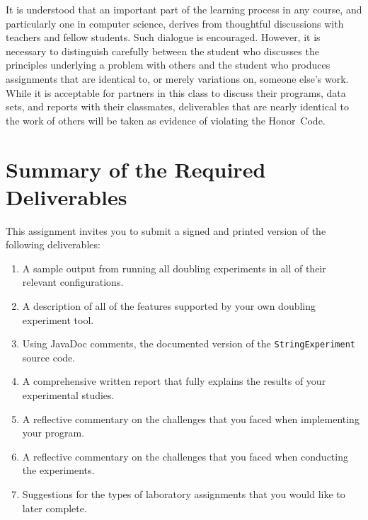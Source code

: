 \noindent It is understood that an important part of the learning process in any course, and particularly one in
computer science, derives from thoughtful discussions with teachers and fellow students.  Such dialogue is encouraged.
However, it is necessary to distinguish carefully between the student who discusses the principles underlying a problem
with others and the student who produces assignments that are identical to, or merely variations on, someone else's
work. While it is acceptable for partners in this class to discuss their programs, data sets, and reports with their
classmates, deliverables that are nearly identical to the work of others will be taken as evidence of violating the
\mbox{Honor Code}.

\section*{Summary of the Required Deliverables}

This assignment invites you to submit a signed and printed version of the following deliverables:

\begin{enumerate}

  \itemsep0in

  \item A sample output from running all doubling experiments in all of their relevant configurations.

  \item A description of all of the features supported by your own doubling experiment tool.

  \item Using JavaDoc comments, the documented version of the {\tt StringExperiment} source code.

  \item A comprehensive written report that fully explains the results of your experimental studies.

  \item A reflective commentary on the challenges that you faced when implementing your program.

  \item A reflective commentary on the challenges that you faced when conducting the experiments.

  \item Suggestions for the types of laboratory assignments that you would like to later complete.

\end{enumerate}

